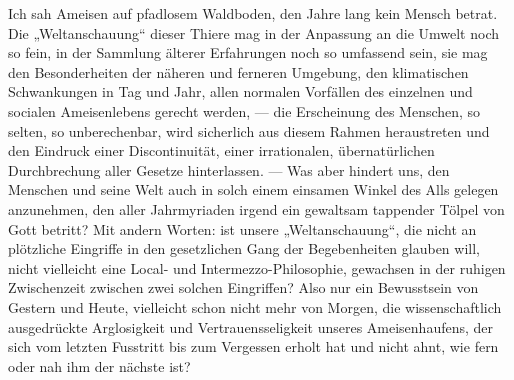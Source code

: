Ich sah Ameisen auf pfadlosem Waldboden, den Jahre lang kein Mensch betrat. Die „Weltanschauung“ dieser Thiere mag in der Anpassung an die Umwelt noch so fein, in der Sammlung älterer Erfahrungen noch so umfassend sein, sie mag den Besonderheiten der näheren und ferneren Umgebung, den klimatischen Schwankungen in Tag und Jahr, allen normalen Vorfällen des einzelnen und socialen Ameisenlebens gerecht werden, — die Erscheinung des Menschen, so selten, so unberechenbar, wird sicherlich aus diesem Rahmen heraustreten und den Eindruck einer Discontinuität, einer irrationalen, übernatürlichen Durchbrechung aller Gesetze hinterlassen. — Was aber hindert uns, den Menschen und seine Welt auch in solch einem einsamen Winkel des Alls gelegen anzunehmen, den aller Jahrmyriaden irgend ein gewaltsam tappender Tölpel von Gott betritt? Mit andern Worten: ist unsere „Weltanschauung“, die nicht an plötzliche Eingriffe in den gesetzlichen Gang der Begebenheiten glauben will, nicht vielleicht eine Local- und Intermezzo-Philosophie, gewachsen in der ruhigen Zwischenzeit zwischen zwei solchen Eingriffen? Also nur ein Bewusstsein von Gestern und Heute, vielleicht schon nicht mehr von Morgen, die wissenschaftlich ausgedrückte Arglosigkeit und Vertrauensseligkeit unseres Ameisenhaufens, der sich vom letzten Fusstritt bis zum Vergessen erholt hat und nicht ahnt, wie fern oder nah ihm der nächste ist?
\par

